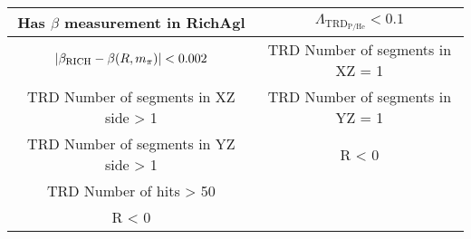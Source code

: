 \begin{table}[h]
\begin{tabular}{cc}
\hline Has $\beta$ measurement in RichAgl                                                                                                                 & $ \Lambda_{\mathrm{TRD}_{\mathrm{P/He}}} < 0.1$                                                                                     \\
\hline $ | \beta_\mathrm{RICH} - \beta(R,m_{{\rm{\pi}}}) | < 0.002 $   & TRD Number of segments in XZ = 1        \\
\hline TRD Number of segments in XZ side > 1                                                  & TRD Number of segments in YZ = 1       \\
\hline TRD Number of segments in YZ side > 1                                                  &  R < 0                                                       \\
\hline TRD Number of hits > 50                                                                           &                                                                  \\
\hline R < 0                                                                                                          &                                                                  \\  
\hline
\end{tabular}
\end{table}




